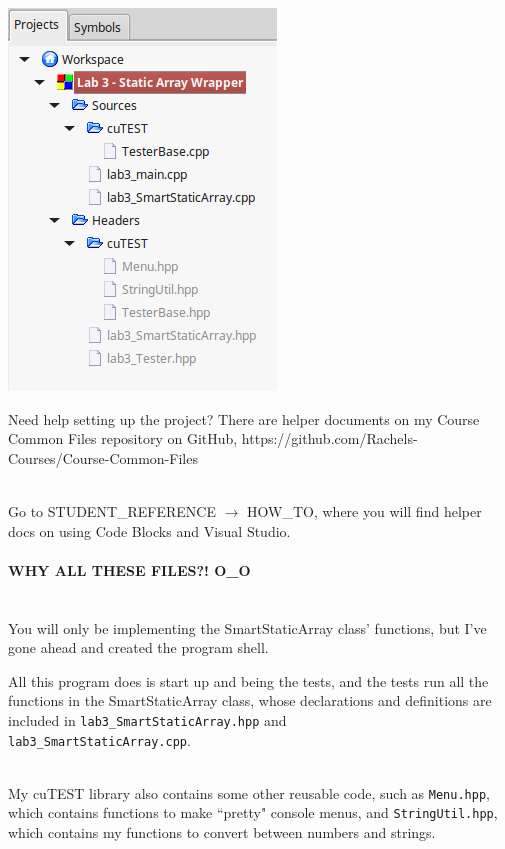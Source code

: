 \documentclass[a4paper,12pt]{book}
\begin{document}
            \includegraphics{images/lab3_projecttree.png}

            \begin{intro}{Need help setting up the project?}
                There are helper documents on my Course Common Files repository on GitHub,
                https://github.com/Rachels-Courses/Course-Common-Files

                ~\\
                Go to STUDENT\_REFERENCE $\to$ HOW\_TO, where you will find
                helper docs on using Code Blocks and Visual Studio.
            \end{intro}
        
            \paragraph{WHY ALL THESE FILES?! O\_O} ~\\
            You will only be implementing the SmartStaticArray class' functions,
            but I've gone ahead and created the program shell.

            All this program does is start up and being the tests, and
            the tests run all the functions in the SmartStaticArray class,
            whose declarations and definitions are included in
            \texttt{lab3\_SmartStaticArray.hpp} and \\
            \texttt{lab3\_SmartStaticArray.cpp}.

            ~\\
            My cuTEST library also contains some other reusable code,
            such as \texttt{Menu.hpp}, which contains functions to make
            ``pretty" console menus, and \texttt{StringUtil.hpp},
            which contains my functions to convert between numbers
            and strings.
\end{document}
